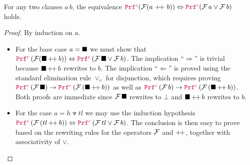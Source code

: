 \smallskip

\begin{lemma}\label{lemma:clause-equiv-disj}
For any two clauses $a\,b$, the equivalence $\pic (\cal{F}(a~\pp~b)) \Leftrightarrow \pic (\cal{F}\,a \lor \cal{F}\,b)$ holds.
\end{lemma}
\begin{proof} By induction on $a$.
  \begin{itemize}
  \item For the base case $a = \nil$ we must show that $\pic\, (\cal{F} (\nil\, \pp \, b)) \Leftrightarrow \pic\, (\cal{F}\,\nil \lor \cal{F}\,b) $. The implication ``$\Rightarrow$'' is trivial because $\nil\,\pp\,b$ rewrites to $b$. The implication ``$\Leftarrow$'' is proved using the standard elimination rule $\lor_e$ for disjunction, which requires proving $\pic\,(\cal{F}\,\nil) \ra \pic\,(\cal{F}\,(\nil\,\pp\,b))$ as well as $\pic\,(\cal{F}\,b) \ra \pic\,(\cal{F}\,(\nil\,\pp\,b))$. Both proofs are immediate since $\cal{F}\,\nil$ rewrites to $\bot$ and $\nil\,\pp\,b$ rewrites to $b$.
  \item For the case $a = h \veedot tl$ we may use the induction hypothesis $\pic\,(\cal{F}\, (tl\, \pp\, b)) \Leftrightarrow \pic\,(\cal{F}\,tl \lor \cal{F}\, b)$. The conclusion is then easy to prove based on the rewriting rules for the operators $\cal{F}$ and $\pp$, together with associativity of $\lor$.
  \end{itemize}
\end{proof}
